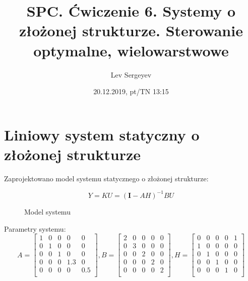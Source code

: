 \documentclass{article}
\author{Lev Sergeyev}
\title{SPC. Ćwiczenie 6. Systemy o złożonej strukturze. Sterowanie optymalne, wielowarstwowe}
\date{20.12.2019, pt/TN 13:15}
\begin{document}
\maketitle



\section{Liniowy system statyczny o złożonej strukturze}
\par
Zaprojektowano model systemu statycznego o złożonej strukturze:

\begin{equation}
Y = K U = (\mathbf{I} - A H)^{-1} B U
\end{equation}

\begin{figure}[h]
\centering
{}
\caption{Model systemu}
\end{figure}

Parametry systemu:
\begin{equation}
A = \begin{bmatrix}
1 & 0 & 0 & 0 & 0\\
0 & 1 & 0 & 0 & 0\\
0 & 0 & 1 & 0 & 0\\
0 & 0 & 0 & 1.3 & 0\\
0 & 0 & 0 & 0 & 0.5\\
\end{bmatrix}
,
B = \begin{bmatrix}
2 & 0 & 0 & 0 & 0\\
0 & 3 & 0 & 0 & 0\\
0 & 0 & 2 & 0 & 0\\
0 & 0 & 0 & 2 & 0\\
0 & 0 & 0 & 0 & 2\\
\end{bmatrix}
,
H = \begin{bmatrix}
0 & 0 & 0 & 0 & 1\\
1 & 0 & 0 & 0 & 0\\
0 & 1 & 0 & 0 & 0\\
0 & 0 & 1 & 0 & 0\\
0 & 0 & 0 & 1 & 0\\
\end{bmatrix}
\end{equation}
\end{document}
